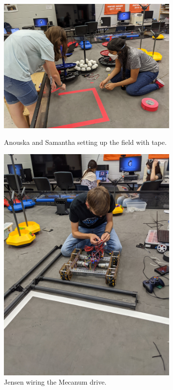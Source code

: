 \begin{figure}[ht]
\centering
\begin{minipage}[b]{.50\textwidth}
  \centering
  \includegraphics[width=0.8\textwidth]{Meetings/September/09-30-21/9-30-21_Hardware_Image1 - Nathan Forrer.jpg}
  \caption{Anouska and Samantha setting up the field with tape.}
  \label{fig:pic1}
\end{minipage}%
\hfill%
\begin{minipage}[b]{.50\textwidth}
  \centering
  \includegraphics[width=0.8\textwidth]{Meetings/September/09-30-21/9-30-21_Hardware_Image2 - Nathan Forrer.jpg}
  \caption{Jensen wiring the Mecanum drive.}
  \label{fig:pic2}
\end{minipage}
\end{figure}

